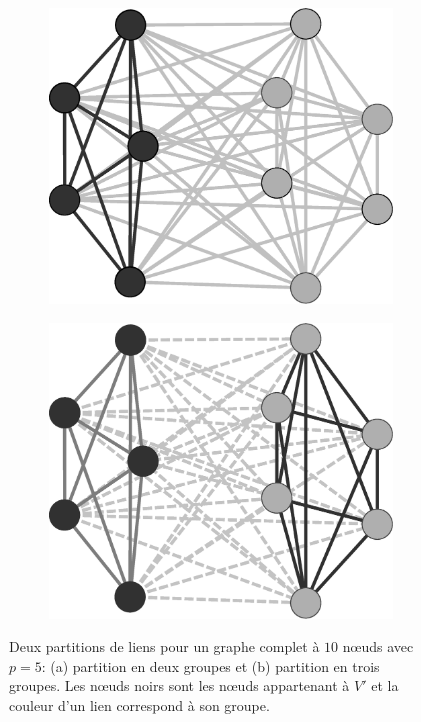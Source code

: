 \begin{figure}
\centering
	\begin{subfigure}{0.2\linewidth}
		\includegraphics[width=\linewidth]{img/ExpectedNodes/1Clique/Clique2}
		\caption{\label{fig:1C2}}	
	\end{subfigure}	\hspace{2cm}
	\begin{subfigure}{0.2\linewidth}
			\includegraphics[width=\linewidth]{img/ExpectedNodes/1Clique/Clique3}
			\caption{\label{fig:1C3}}		
	\end{subfigure}
	\caption{Deux partitions de liens pour un graphe complet à $10$ n\oe uds avec $p=5$: (a) partition en deux groupes et (b) partition en trois groupes.
	Les n\oe uds noirs sont les n\oe uds appartenant à $V'$ et la couleur d'un lien correspond à son groupe.}
	\label{fig:1C}
\end{figure}


